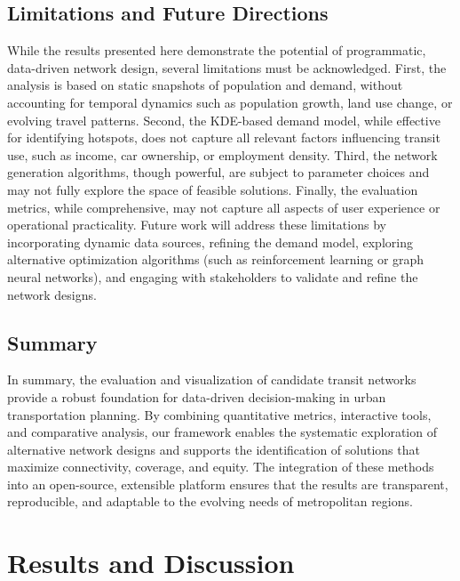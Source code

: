 \documentclass[manuscript,screen,review]{acmart}
\begin{document}
\subsection{Limitations and Future Directions}
While the results presented here demonstrate the potential of programmatic, data-driven network design, several limitations must be acknowledged. First, the analysis is based on static snapshots of population and demand, without accounting for temporal dynamics such as population growth, land use change, or evolving travel patterns. Second, the KDE-based demand model, while effective for identifying hotspots, does not capture all relevant factors influencing transit use, such as income, car ownership, or employment density. Third, the network generation algorithms, though powerful, are subject to parameter choices and may not fully explore the space of feasible solutions. Finally, the evaluation metrics, while comprehensive, may not capture all aspects of user experience or operational practicality. Future work will address these limitations by incorporating dynamic data sources, refining the demand model, exploring alternative optimization algorithms (such as reinforcement learning or graph neural networks), and engaging with stakeholders to validate and refine the network designs.

\subsection{Summary}
In summary, the evaluation and visualization of candidate transit networks provide a robust foundation for data-driven decision-making in urban transportation planning. By combining quantitative metrics, interactive tools, and comparative analysis, our framework enables the systematic exploration of alternative network designs and supports the identification of solutions that maximize connectivity, coverage, and equity. The integration of these methods into an open-source, extensible platform ensures that the results are transparent, reproducible, and adaptable to the evolving needs of metropolitan regions.

\section{Results and Discussion}
\end{document}
